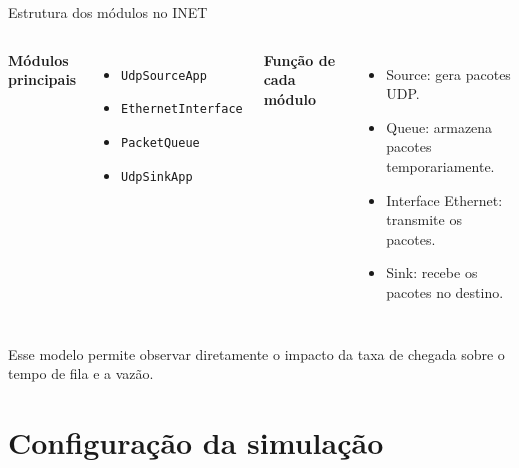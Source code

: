 \documentclass[aspectratio=169]{beamer}
\begin{document}
\begin{frame}{Estrutura dos módulos no INET}
\begin{columns}[T,onlytextwidth]

\textbf{Módulos principais}
\begin{itemize}
    \item \texttt{UdpSourceApp}
    \item \texttt{EthernetInterface}
    \item \texttt{PacketQueue}
    \item \texttt{UdpSinkApp}
\end{itemize}

\textbf{Função de cada módulo}
\begin{itemize}
    \item Source: gera pacotes UDP.
    \item Queue: armazena pacotes temporariamente.
    \item Interface Ethernet: transmite os pacotes.
    \item Sink: recebe os pacotes no destino.
\end{itemize}

\end{columns}

\vspace{0.5cm}
\begin{informacao}
Esse modelo permite observar diretamente o impacto da taxa de chegada sobre o tempo de fila e a vazão.
\end{informacao}
\end{frame}

\section{Configuração da simulação}
\end{document}
